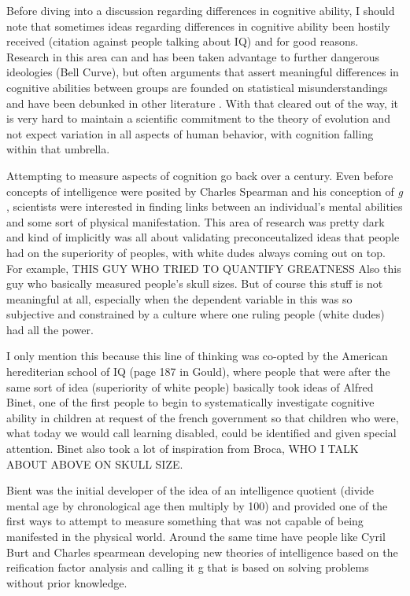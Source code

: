 \documentclass[]{book}
\theoremstyle{definition}
\theoremstyle{definition}
\theoremstyle{definition}
\theoremstyle{remark}
\begin{document}
Before diving into a discussion regarding differences in cognitive
ability, I should note that sometimes ideas regarding differences in
cognitive ability been hostily received (citation against people talking
about IQ) and for good reasons. Research in this area can and has been
taken advantage to further dangerous ideologies (Bell Curve), but often
arguments that assert meaningful differences in cognitive abilities
between groups are founded on statistical misunderstandings and have
been debunked in other literature \citep{gouldMismeasureMan1996}. With
that cleared out of the way, it is very hard to maintain a scientific
commitment to the theory of evolution \citep{darwinOriginSpecies1859}
and not expect variation in all aspects of human behavior, with
cognition falling within that umbrella.

Attempting to measure aspects of cognition go back over a century. Even
before concepts of intelligence were posited by Charles Spearman and his
conception of \emph{g}
\citep{spearmanGeneralIntelligenceObjectively1904}, scientists were
interested in finding links between an individual's mental abilities and
some sort of physical manifestation. This area of research was pretty
dark and kind of implicitly was all about validating preconceutalized
ideas that people had on the superiority of peoples, with white dudes
always coming out on top. For example, THIS GUY WHO TRIED TO QUANTIFY
GREATNESS Also this guy who basically measured people's skull sizes. But
of course this stuff is not meaningful at all, especially when the
dependent variable in this was so subjective and constrained by a
culture where one ruling people (white dudes) had all the power.

I only mention this because this line of thinking was co-opted by the
American herediterian school of IQ (page 187 in Gould), where people
that were after the same sort of idea (superiority of white people)
basically took ideas of Alfred Binet, one of the first people to begin
to systematically investigate cognitive ability in children at request
of the french government so that children who were, what today we would
call learning disabled, could be identified and given special attention.
Binet also took a lot of inspiration from Broca, WHO I TALK ABOUT ABOVE
ON SKULL SIZE.

Bient was the initial developer of the idea of an intelligence quotient
(divide mental age by chronological age then multiply by 100) and
provided one of the first ways to attempt to measure something that was
not capable of being manifested in the physical world. Around the same
time have people like Cyril Burt and Charles spearmean developing new
theories of intelligence based on the reification factor analysis and
calling it g that is based on solving problems without prior knowledge.
\end{document}
